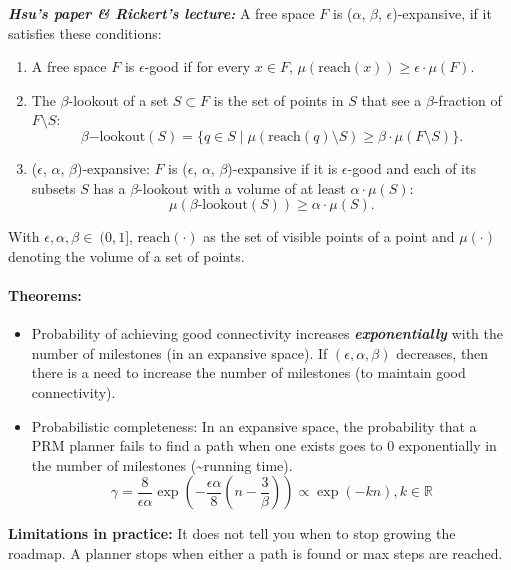 \begin{multicols*}{2}
\textit{\textbf{Hsu's paper \& Rickert's lecture:}} A free space $F$ is ($\alpha$, $\beta$, $\epsilon$)-expansive, if it satisfies these conditions: 
\begin{enumerate}
	\item A free space $F$ is $\epsilon$-good if for every $x \in F$, $\mu (\text{reach}(x)) \geq \epsilon \cdot \mu(F)$.
	\item The $\beta$-lookout of a set $S\subset F$ is the set of points in $S$ that see a $\beta$-fraction of $F \setminus S$:
	\[\beta\mathrm{-lookout}(S) = \{q\in S \; \vert \; \mu(\text{reach}(q) \setminus S) \geq \beta \cdot \mu(F \setminus S)\}. \]
	\item ($\epsilon$, $\alpha$, $\beta$)-expansive: $F$ is ($\epsilon$, $\alpha$, $\beta$)-expansive if it is $\epsilon$-good and each of its 	subsets $S$ has a $\beta$-lookout with a volume of at least $\alpha \cdot \mu(S)$:
	\[\mu(\beta\text{-lookout}(S)) \geq \alpha \cdot \mu(S).\]
\end{enumerate}
With $\epsilon, \alpha, \beta \in \ (0,1]$, $\text{reach}(\cdot)$ as the set of visible points of a point and $\mu(\cdot)$ denoting the volume of a set of points.\par

\paragraph{Theorems:}
\begin{itemize}
	\item Probability of achieving good connectivity increases \textit{\textbf{exponentially}} with the number of milestones (in an expansive space). If $(\epsilon, \alpha, \beta)$ decreases, then there is a need to increase the number of milestones (to maintain good connectivity).
	\item Probabilistic completeness: In an expansive space, the probability that a PRM planner fails to find a path when one exists goes to $0$ exponentially in the number of milestones (\textasciitilde running time).
	\[\gamma = \frac{8}{\epsilon \alpha} \exp\left (- \frac{\epsilon \alpha}{8} \left (n - \frac{3}{\beta}\right )\right ) \propto \exp(-kn), k \in \mathbb{R} \]
\end{itemize}

\textbf{Limitations in practice:} It does not tell you when to stop growing the roadmap. A planner stops when either a path is found or max steps are reached.\par


\end{multicols*}
